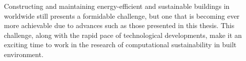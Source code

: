 Constructing and maintaining energy-efficient and sustainable buildings in worldwide still presents a formidable challenge, but one that is becoming ever more achievable due to advances such as those presented in this thesis. This challenge, along with the rapid pace of technological developments, make it an exciting time to work in the research of computational sustainability in built environment.












%
%
%
%
%
%
%
%
%

